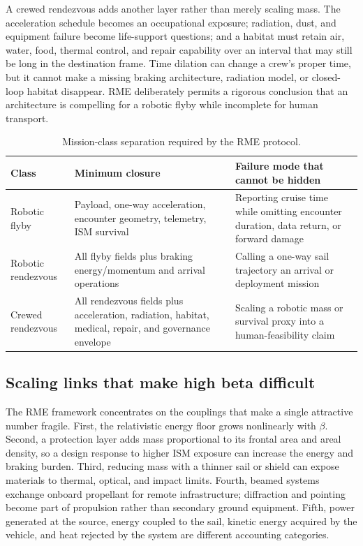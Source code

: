 \documentclass[conference]{../../../../Conference-LaTeX-template_10-17-19/IEEEtran}
\begin{document}
A crewed rendezvous adds another layer rather than merely scaling mass. The acceleration schedule becomes an occupational exposure; radiation, dust, and equipment failure become life-support questions; and a habitat must retain air, water, food, thermal control, and repair capability over an interval that may still be long in the destination frame. Time dilation can change a crew's proper time, but it cannot make a missing braking architecture, radiation model, or closed-loop habitat disappear. RME deliberately permits a rigorous conclusion that an architecture is compelling for a robotic flyby while incomplete for human transport.

\begin{table}[t]
\caption{Mission-class separation required by the RME protocol.}
\label{tab:mission-classes}
\centering
\footnotesize
\begin{tabularx}{\columnwidth}{@{}p{}Y Y@{}}
\toprule
\textbf{Class} & \textbf{Minimum closure} & \textbf{Failure mode that cannot be hidden} \\
\midrule
Robotic flyby & Payload, one-way acceleration, encounter geometry, telemetry, ISM survival & Reporting cruise time while omitting encounter duration, data return, or forward damage \\
Robotic rendezvous & All flyby fields plus braking energy/momentum and arrival operations & Calling a one-way sail trajectory an arrival or deployment mission \\
Crewed rendezvous & All rendezvous fields plus acceleration, radiation, habitat, medical, repair, and governance envelope & Scaling a robotic mass or survival proxy into a human-feasibility claim \\
\bottomrule
\end{tabularx}
\end{table}

\subsection{Scaling links that make high beta difficult}
The RME framework concentrates on the couplings that make a single attractive number fragile. First, the relativistic energy floor grows nonlinearly with $\beta$. Second, a protection layer adds mass proportional to its frontal area and areal density, so a design response to higher ISM exposure can increase the energy and braking burden. Third, reducing mass with a thinner sail or shield can expose materials to thermal, optical, and impact limits. Fourth, beamed systems exchange onboard propellant for remote infrastructure; diffraction and pointing become part of propulsion rather than secondary ground equipment. Fifth, power generated at the source, energy coupled to the sail, kinetic energy acquired by the vehicle, and heat rejected by the system are different accounting categories.
\end{document}
